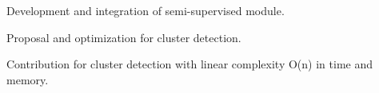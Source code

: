 \begin{cventries}
{\begin{cvitems}
       \item {Development and integration of semi-supervised module.}
       \item {Proposal and optimization for cluster detection.}
       \item {Contribution for cluster detection with linear complexity O(n) in time and memory.}
      \end{cvitems}
    }
\end{cventries}
